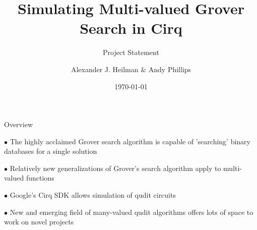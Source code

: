 \documentclass[xcolor=dvipsnames]{beamer}
\title[Title]
{
Simulating Multi-valued Grover Search in Cirq
}
\subtitle{Project Statement}
\author{ Alexander J. Heilman \& Andy Phillips }
\date{\today} %
\begin{document}
\begin{frame}
    \titlepage
\end{frame}

\begin{frame}{Overview}
          
$\bullet$ The highly acclaimed Grover search algorithm is     
          capable of 'searching' binary databases for 
          a single solution          
          
\medskip\pause          
          
$\bullet$ Relatively new generalizations of Grover's search
          algorithm apply to multi-valued 
          functions \cite{hunt2020}\cite{fan2008}
          
\medskip\pause          
          

$\bullet$ Google's Cirq SDK allows simulation of qudit
          circuits

\medskip\pause

$\bullet$ New and emerging field of many-valued qudit
          algorithms offers lots of space to work on novel 
          projects

\end{frame}
\end{document}
